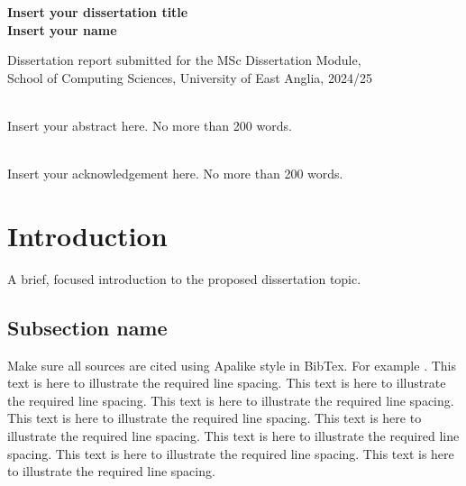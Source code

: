 \documentclass[12pt]{article}
\begin{document}
	
\begin{center}
\vspace*{4cm}
	{\Huge \bf{ Insert your dissertation title} }\\
\vspace{2.5cm}
	{\LARGE \bf{ Insert your name } }\\
\vspace*{12cm}

Dissertation report submitted for the MSc Dissertation Module, \\
School of Computing Sciences, University of East Anglia, 2024/25
\end{center}

\newpage

\vspace{5cm}
\\
Insert your abstract here. No more than 200 words. 

\newpage
\vspace{5cm}
	
\\
Insert your acknowledgement here. No more than 200 words. 

\newpage

\tableofcontents

\newpage

\section{Introduction}
A brief, focused introduction to the proposed dissertation topic.


\subsection{Subsection name}

Make sure all sources are cited using Apalike style in BibTex. For example \cite{canli2021deep}. This text is here to illustrate the required line spacing. This text is here to illustrate the required line spacing. This text is here to illustrate the required line spacing. This text is here to illustrate the required line spacing. This text is here to illustrate the required line spacing. This text is here to illustrate the required line spacing. This text is here to illustrate the required line spacing. This text is here to illustrate the required line spacing.
\end{document}
